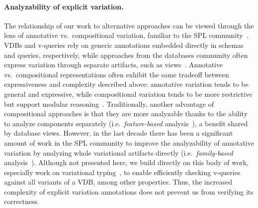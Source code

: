 \paragraph{Analyzability of explicit variation.}
%
The relationship of our work to alternative approaches can be viewed through
the lens of annotative vs.\ compositional variation, familiar to the SPL
community~\cite{KAK08}.
%
VDBs and v-queries rely on generic annotations embedded directly in schemas and
queries, respectively, while approaches from the databases community often
express variation through separate artifacts, such as views~\cite{bancilhon81}.
%
Annotative vs.\ compositional representations often exhibit the same tradeoff
between expressiveness and complexity described above: annotative variation
tends to be general and expressive, while compositional variation tends to be
more restrictive but support modular reasoning~\cite{KAK08}.
%
Traditionally, another advantage of compositional approaches is that they are
more analyzable thanks to the ability to analyze components separately (i.e.\
\emph{feature-based} analysis~\citep{Thuem14}), a benefit shared by database
views.
%
However, in the last decade there has been a significant amount of work in the
SPL community to improve the analyzability of annotative variation by analyzing
whole variational artifacts directly (i.e.\ \emph{family-based}
analysis~\cite{Thuem14}). 
%
Although not presented here, we build directly on this body of work, especially
work on variational typing~\cite{CEW12icfp,CEW14toplas}, to enable efficiently
checking v-queries against all variants of a VDB, among other properties.
%
Thus, the increased complexity of explicit variation annotations does not
prevent us from verifying its correctness.

%


%
%

